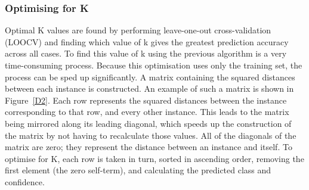 \subsubsection{Optimising for K}
Optimal K values are found by performing leave-one-out cross-validation (LOOCV) and finding which value of k gives the greatest prediction accuracy across all cases. To find this value of k using the previous algorithm is a very time-consuming process. Because this optimisation uses only the training set, the process can be sped up significantly. A matrix containing the squared distances between each instance is constructed. An example of such a matrix is shown in Figure~\ref{D2}. Each row represents the squared distances between the instance corresponding to that row, and every other instance. This leads to the matrix being mirrored along its leading diagonal, which speeds up the construction of the matrix by not having to recalculate those values. All of the diagonals of the matrix are zero; they represent the distance between an instance and itself. To optimise for K, each row is taken in turn, sorted in ascending order, removing the first element (the zero self-term), and calculating the predicted class and confidence.



